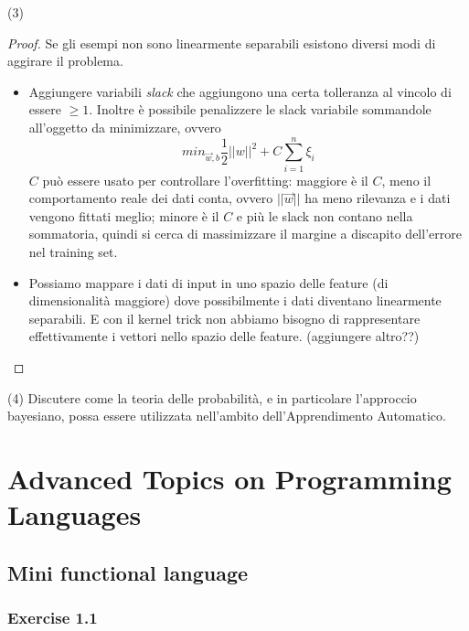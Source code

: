 \documentclass[12pt,a4paper,oneside]{book}
\begin{document}
\begin{exercise}{(3)}
\begin{proof}
   		Se gli esempi non sono linearmente separabili esistono diversi modi di aggirare il problema.
   		\begin{itemize}
   			\item Aggiungere variabili \emph{slack} che aggiungono una certa tolleranza al vincolo di essere $\geq 1$. Inoltre è possibile penalizzere le slack variabile sommandole all'oggetto da minimizzare, ovvero
   			\[
   				min_{\vec{w},b} \frac{1}{2} ||w||^2 + C \sum_{i=1}^{n} \xi_i
   			\]
   			$C$ può essere usato per controllare l'overfitting: maggiore è il $C$, meno il comportamento reale dei dati conta, ovvero $||\vec{w}||$ ha meno rilevanza e i dati vengono fittati meglio; minore è il $C$ e più le slack non contano nella sommatoria, quindi si cerca di massimizzare il margine a discapito dell'errore nel training set.
   			
   			\item Possiamo mappare i dati di input in uno spazio delle feature (di dimensionalità maggiore) dove possibilmente i dati diventano linearmente separabili.
   			E con il kernel trick non abbiamo bisogno di rappresentare effettivamente i vettori nello spazio delle feature.
   			(aggiungere altro??)
   		\end{itemize}
    \end{proof}
\end{exercise}

\begin{exercise}{(4)}
    Discutere come la teoria delle probabilità, e in particolare
    l'approccio bayesiano, possa essere utilizzata nell'ambito
    dell'Apprendimento Automatico.
\end{exercise}

\chapter{Advanced Topics on Programming Languages}

\section{Mini functional language}

\subsection{Exercise 1.1}
\end{document}
